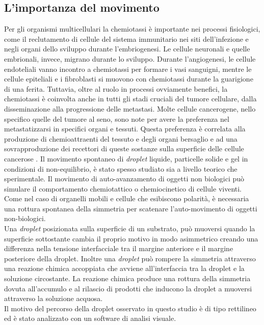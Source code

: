 \subsection{L'importanza del movimento}
\label{sec:00456}
Per gli organismi multicellulari la chemiotassi è importante nei processi fisiologici, come il reclutamento di cellule del sistema immunitario nei siti dell'infezione e negli organi dello sviluppo durante l'embriogenesi.\cite{cellMig} Le cellule neuronali e quelle embrionali, invece, migrano durante lo sviluppo. Durante l'angiogenesi, le cellule endoteliali vanno incontro a chemiotassi per formare i vasi sanguigni, mentre le cellule epiteliali e i fibroblasti si muovono con chemiotassi durante la guarigione di una ferita.\cite{move1} Tuttavia, oltre al ruolo in processi ovviamente benefici, la chemiotassi è coinvolta anche in tutti gli stadi cruciali del tumore cellulare, dalla disseminazione alla progressione delle metastasi. Molte cellule cancerogene, nello specifico quelle del tumore al seno, sono note per avere la preferenza nel metastatizzarsi in specifici organi e tessuti. Questa preferenza è correlata alla produzione di chemioattraenti del tessuto e degli organi bersaglio e ad una sovrapproduzione dei recettori di queste sostanze sulla superficie delle cellule cancerose \cite{chemocancer}.
Il movimento spontaneo di \emph{droplet} liquide, particelle solide e gel in condizioni di non-equilibrio, è stato spesso studiato sia a livello teorico che sperimentale. Il movimento di auto-avanzamento di oggetti non biologici può simulare il comportamento chemiotattico o chemiocinetico di cellule viventi.
Come nel caso di organelli mobili e cellule che esibiscono polarità, è necessaria una rottura spontanea della simmetria per scatenare l'auto-movimento di oggetti non-biologici. 
\\Una \emph{droplet} posizionata sulla superficie di un substrato, può muoversi quando la superficie sottostante cambia il proprio motivo in modo asimmetrico creando una differenza nella tensione interfacciale tra il margine anteriore e il margine posteriore della droplet. Inoltre una \emph{droplet} può rompere la simmetria attraverso una reazione chimica accoppiata che avviene all'interfaccia tra la droplet e la soluzione circostante. La reazione chimica produce una rottura della simmetria dovuta all'accumulo e al rilascio di prodotti che inducono la droplet a muoversi attraverso la soluzione acquosa.\cite{selfpropelled}
\\Il motivo del percorso della droplet osservato in questo studio è di tipo rettilineo ed è stato analizzato con un software di analisi visuale. 


